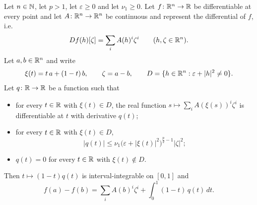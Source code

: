 \begin{lemma}
Let $n\in\mathbb{N}$, let $p>1$, let $\varepsilon\ge0$ and let $\nu_1\ge0$.  Let
$f\colon\mathbb{R}^n\to\mathbb{R}$ be differentiable at every point and let
$A\colon\mathbb{R}^n\to\mathbb{R}^n$ be continuous and represent the differential of $f$, i.e.
\[
Df(h)[\zeta]=\sum_iA(h)^i\zeta^i\qquad(h,\zeta\in\mathbb{R}^n).
\]
Let $a,b\in\mathbb{R}^n$ and write
\[
\xi(t)=t\,a+(1-t)\,b,\qquad\zeta=a-b,\qquad
D=\{h\in\mathbb{R}^n:\varepsilon+|h|^2\ne0\}.
\]
Let $q\colon\mathbb{R}\to\mathbb{R}$ be a function such that
\begin{itemize}
\item[(i)] for every $t\in\mathbb{R}$ with $\xi(t)\in D$, the real function
  $s\mapsto\sum_iA(\xi(s))^i\zeta^i$ is differentiable at $t$ with derivative
  $q(t)$;
\item[(ii)] for every $t\in\mathbb{R}$ with $\xi(t)\in D$,
  \[
  |q(t)|\le\nu_1\bigl(\varepsilon+|\xi(t)|^2\bigr)^{\frac p2-1}|\zeta|^2 ;
  \]
\item[(iii)] $q(t)=0$ for every $t\in\mathbb{R}$ with $\xi(t)\notin D$.
\end{itemize}
Then $t\mapsto(1-t)q(t)$ is interval-integrable on $[0,1]$ and
\[
f(a)-f(b)=\sum_iA(b)^i\zeta^i+\int_0^1(1-t)\,q(t)\,dt .
\]
\end{lemma}
